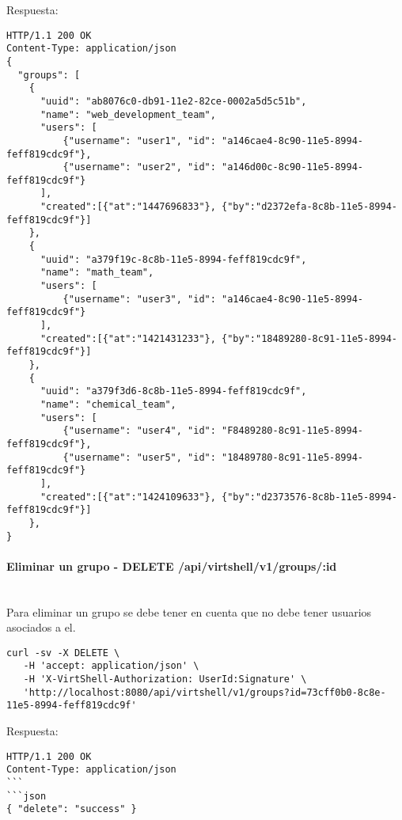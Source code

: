 \vspace{1cm}
Respuesta:
\vspace{1cm}

\begin{lstlisting}[style=json]
HTTP/1.1 200 OK
Content-Type: application/json
{
  "groups": [
    {
      "uuid": "ab8076c0-db91-11e2-82ce-0002a5d5c51b",
      "name": "web_development_team",
      "users": [ 
          {"username": "user1", "id": "a146cae4-8c90-11e5-8994-feff819cdc9f"},
          {"username": "user2", "id": "a146d00c-8c90-11e5-8994-feff819cdc9f"}
      ],     
      "created":[{"at":"1447696833"}, {"by":"d2372efa-8c8b-11e5-8994-feff819cdc9f"}]
    },
    {
      "uuid": "a379f19c-8c8b-11e5-8994-feff819cdc9f",
      "name": "math_team",
      "users": [ 
          {"username": "user3", "id": "a146cae4-8c90-11e5-8994-feff819cdc9f"}
      ],     
      "created":[{"at":"1421431233"}, {"by":"18489280-8c91-11e5-8994-feff819cdc9f"}]
    },
    {
      "uuid": "a379f3d6-8c8b-11e5-8994-feff819cdc9f",
      "name": "chemical_team",
      "users": [ 
          {"username": "user4", "id": "F8489280-8c91-11e5-8994-feff819cdc9f"},
          {"username": "user5", "id": "18489780-8c91-11e5-8994-feff819cdc9f"}
      ],       
      "created":[{"at":"1424109633"}, {"by":"d2373576-8c8b-11e5-8994-feff819cdc9f"}]
    },        
}  
\end{lstlisting}

\paragraph{Eliminar un grupo - DELETE /api/virtshell/v1/groups/:id} ~\\

Para eliminar un grupo se debe tener en cuenta que no debe tener usuarios asociados a el.

\begin{lstlisting}[style=json]
curl -sv -X DELETE \
   -H 'accept: application/json' \
   -H 'X-VirtShell-Authorization: UserId:Signature' \
   'http://localhost:8080/api/virtshell/v1/groups?id=73cff0b0-8c8e-11e5-8994-feff819cdc9f'
\end{lstlisting}

\vspace{1cm}
Respuesta:
\vspace{1cm}

\begin{lstlisting}[style=json]
HTTP/1.1 200 OK
Content-Type: application/json
```
```json
{ "delete": "success" }
\end{lstlisting}
